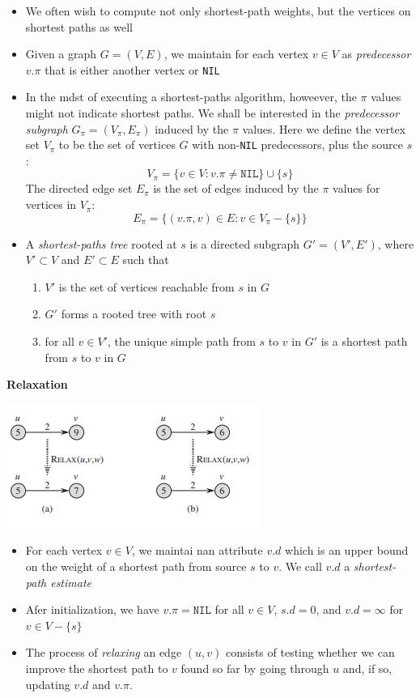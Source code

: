\documentclass{report}
\begin{document}
\begin{itemize}
    \item We often wish to compute not only shortest-path weights, but the vertices on shortest paths as well
    \item Given a graph $G = (V, E)$, we maintain for each vertex $v \in V$ as \textit{predecessor} $v.\pi$ that is either another vertex or \texttt{NIL}
    \item In the mdst of executing a shortest-paths algorithm, howeever, the $\pi$ values might not indicate shortest paths. We shall be interested in the \textit{predecessor subgraph} $G_{\pi} = (V_{\pi}, E_{\pi})$ induced by the $\pi$ values. Here we define the vertex set $V_{\pi}$ to be the set of vertices $G$ with non-\texttt{NIL} predecessors, plus the source $s$:
    $$V_{\pi} = \{v \in V: v.\pi \neq \texttt{NIL}\} \cup \{s\}$$
    The directed edge set $E_{\pi}$ is the set of edges induced by the $\pi$ values for vertices in $V_{\pi}$:
    $$E_{\pi} = \{(v.\pi, v) \in E: v \in V_{\pi} - \{s\}\}$$
    \item A \textit{shortest-paths tree} rooted at $s$ is a directed subgraph $G' = (V', E')$, where $V' \subset V$ and $E' \subset E$ such that
    \begin{enumerate}
        \item $V'$ is the set of vertices reachable from $s$ in $G$
        \item $G'$ forms a rooted tree with root $s$
        \item for all $v \in V'$, the unique simple path from $s$ to $v$ in $G'$ is a shortest path from $s$ to $v$ in $G$
    \end{enumerate}
\end{itemize}
\textbf{Relaxation}
\begin{center}
    \includegraphics[width = 6 cm]{../entities/relaxing.png}
\end{center}
\begin{itemize}
    \item For each vertex $v \in V$, we maintai nan attribute $v.d$ which is an upper bound on the weight of a shortest path from source $s$ to $v$. We call $v.d$ a \textit{shortest-path estimate}
    \item Afer initialization, we have $v.\pi = \texttt{NIL}$ for all $v \in V$, $s.d = 0$, and $v.d = \infty$ for $v \in V - \{s\}$
    \item The process of \textit{relaxing} an edge $(u, v)$ consists of testing whether we can improve the shortest path to $v$ found so far by going through $u$ and, if so, updating $v.d$ and $v.\pi$.
\end{itemize}
\end{document}
